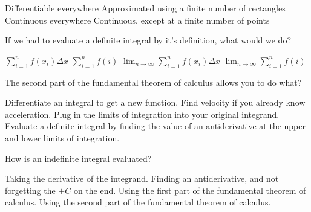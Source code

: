 \documentclass{exam}
\begin{document}
\begin{questions}
\begin{choices}
\choice Differentiable everywhere
\choice Approximated using a finite number of rectangles
\choice Continuous everywhere
\choice Continuous, except at a finite number of points
\end{choices}
\question
If we had to evaluate a definite integral by it's definition, what would we do?\begin{choices}
\choice $\sum_{i=1}^n f(x_i) \Delta x$
\choice $\sum_{i=1}^n f(i)$
\choice $\lim_{n\rightarrow \infty} \sum_{i=1}^n f(x_i) \Delta x$
\choice $\lim_{n\rightarrow \infty} \sum_{i=1}^n f(i)$
\end{choices}
\question
The second part of the fundamental theorem of calculus allows you to do what?
\begin{choices}
\choice Differentiate an integral to get a new function.
\choice Find velocity if you already know acceleration.
\choice Plug in the limits of integration into your original integrand.
\choice Evaluate a definite integral by finding the value of an antiderivative at the upper and lower limits of integration.
\end{choices}
\question
How is an indefinite integral evaluated?
\begin{choices}
\choice Taking the derivative of the integrand.
\choice Finding an antiderivative, and not forgetting the $+C$ on the end.
\choice Using the first part of the fundamental theorem of calculus.
\choice Using the second part of the fundamental theorem of calculus.
\end{choices}

\end{questions}
\end{document}
